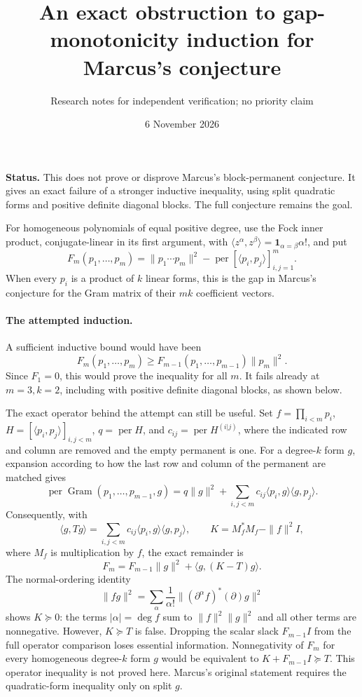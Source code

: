 \documentclass[11pt]{article}
\title{An exact obstruction to gap-monotonicity induction for Marcus's conjecture}
\author{Research notes for independent verification; no priority claim}
\date{6 November 2026}
\newcommand{\per}{\operatorname{per}}
\begin{document}
\maketitle
\noindent\textbf{Status.} This does not prove or disprove Marcus's
block-permanent conjecture. It gives an exact failure of a stronger
inductive inequality, using split quadratic forms and positive definite
diagonal blocks. The full conjecture remains the goal.

For homogeneous polynomials of equal positive degree, use the Fock inner
product, conjugate-linear in its first argument, with
$\langle z^\alpha,z^\beta\rangle=\mathbf1_{\alpha=\beta}\alpha!$, and put
\[
 F_m(p_1,\ldots,p_m)=\|p_1\cdots p_m\|^2
             -\per[\langle p_i,p_j\rangle]_{i,j=1}^m.
\]
When every $p_i$ is a product of $k$ linear forms, this is the gap in
Marcus's conjecture for the Gram matrix of their $mk$ coefficient vectors.

\paragraph{The attempted induction.}
A sufficient inductive bound would have been
\begin{equation}\label{bad}
 F_m(p_1,\ldots,p_m)\ge
 F_{m-1}(p_1,\ldots,p_{m-1})\|p_m\|^2.
\end{equation}
Since $F_1=0$, this would prove the inequality for all $m$.
It fails already at $m=3,k=2$, including with positive definite diagonal
blocks, as shown below.

The exact operator behind the attempt can still be useful. Set
$f=\prod_{i<m}p_i$, $H=[\langle p_i,p_j\rangle]_{i,j<m}$,
$q=\per H$, and $c_{ij}=\per H^{(i|j)}$, where the indicated row and
column are removed and the empty permanent is one. For a degree-$k$ form $g$,
expansion according to how the last row and column of the permanent are
matched gives
\[
 \per\operatorname{Gram}(p_1,\ldots,p_{m-1},g)
 =q\|g\|^2+\sum_{i,j<m}c_{ij}
       \langle p_i,g\rangle\langle g,p_j\rangle.
\]
Consequently, with
\[
 \langle g,Tg\rangle=
 \sum_{i,j<m}c_{ij}\langle p_i,g\rangle\langle g,p_j\rangle,
 \qquad K=M_f^*M_f-\|f\|^2I,
\]
where $M_f$ is multiplication by $f$, the exact remainder is
\begin{equation}\label{remainder}
 F_m=F_{m-1}\|g\|^2+\langle g,(K-T)g\rangle.
\end{equation}
The normal-ordering identity
\[
 \|fg\|^2=\sum_\alpha\frac1{\alpha!}
       \|(\partial^\alpha f)^*(\partial)g\|^2
\]
shows $K\succeq0$: the terms $|\alpha|=\deg f$ sum to
$\|f\|^2\|g\|^2$ and all other terms are nonnegative.
However, $K\succeq T$ is false. Dropping the scalar slack
$F_{m-1}I$ from the full operator comparison loses essential information.
Nonnegativity of $F_m$ for every homogeneous degree-$k$ form $g$ would
be equivalent to $K+F_{m-1}I\succeq T$. This operator inequality is not
proved here. Marcus's original statement requires the quadratic-form
inequality only on split $g$.
\end{document}
